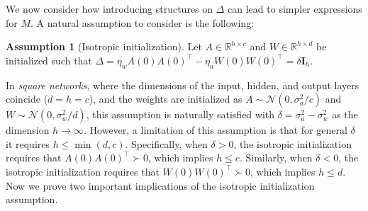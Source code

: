 \documentclass{article}
\theoremstyle{plain}
\theoremstyle{definition}
\newtheorem{assumption}[theorem]{Assumption}
\theoremstyle{remark}
\begin{document}
We now consider how introducing structures on $\Delta$ can lead to simpler expressions for $M$.
%
A natural assumption to consider is the following:

\begin{assumption}[Isotropic initialization]
    Let $A \in \mathbb{R}^{h \times c}$ and $W \in \mathbb{R}^{h \times d}$ be initialized such that $\Delta = \eta_w A(0)A(0)^\intercal - \eta_a W(0)W(0)^\intercal= \delta \mathbf{I}_h$.
\end{assumption}

In \emph{square networks}, where the dimensions of the input, hidden, and output layers coincide ($d = h = c$), and the weights are initialized as $A \sim \mathcal{N}(0, \sigma_a^2/c)$ and $W \sim \mathcal{N}(0, \sigma_w^2/d)$, this assumption is naturally satisfied with $\delta = \sigma_a^2 - \sigma_w^2$ as the dimension $h \to \infty$.
%
However, a limitation of this assumption is that for general $\delta$ it requires $h \le \min( d, c)$.
%
Specifically, when $\delta > 0$, the isotropic initialization requires that $A(0)A(0)^\intercal \succ 0$, which implies $h \le c$.
%
Similarly, when $\delta <  0$, the isotropic initialization requires that $W(0)W(0)^\intercal \succ 0$, which implies $h \le d$.
%
Now we prove two important implications of the isotropic initialization assumption.
\end{document}

